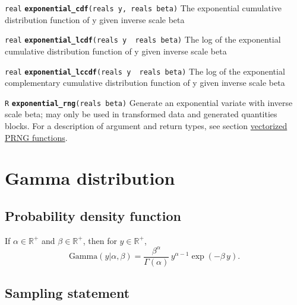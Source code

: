 \documentclass[
  10pt,
]{book}
\begin{document}
\texttt{real} \textbf{\texttt{exponential\_cdf}}\texttt{(reals\ y,\ reals\ beta)}\newline
The exponential cumulative distribution function of y given inverse
scale beta


\texttt{real} \textbf{\texttt{exponential\_lcdf}}\texttt{(reals\ y\ \textbar{}\ reals\ beta)}\newline
The log of the exponential cumulative distribution function of y given
inverse scale beta


\texttt{real} \textbf{\texttt{exponential\_lccdf}}\texttt{(reals\ y\ \textbar{}\ reals\ beta)}\newline
The log of the exponential complementary cumulative distribution
function of y given inverse scale beta


\texttt{R} \textbf{\texttt{exponential\_rng}}\texttt{(reals\ beta)}\newline
Generate an exponential variate with inverse scale beta; may only be
used in transformed data and generated quantities blocks.
For a description of argument and return types, see section
\protect\hyperlink{prng-vectorization}{vectorized PRNG functions}.

\hypertarget{gamma-distribution}{%
\section{Gamma distribution}\label{gamma-distribution}}

\hypertarget{probability-density-function-13}{%
\subsection{Probability density function}\label{probability-density-function-13}}

If \(\alpha \in \mathbb{R}^+\) and \(\beta \in \mathbb{R}^+\), then for \(y \in \mathbb{R}^+\), \[ \text{Gamma}(y|\alpha,\beta) =
\frac{\beta^{\alpha}}      {\Gamma(\alpha)} \, y^{\alpha - 1}
\exp(-\beta \, y) . \]

\hypertarget{sampling-statement-37}{%
\subsection{Sampling statement}\label{sampling-statement-37}}
\end{document}
